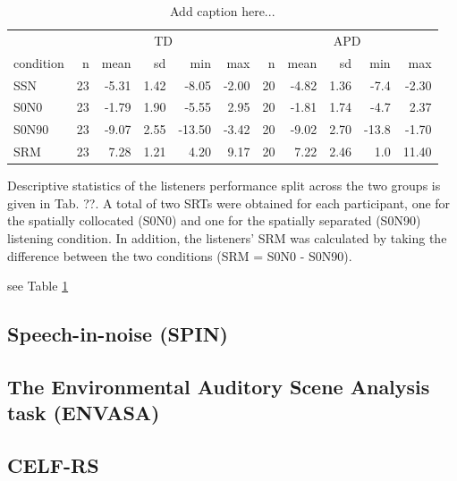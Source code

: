 \documentclass[a4paper, twoside]{templates/ociamthesis}
\begin{document}
\begin{table}

\caption{\label{tab:LiSNS-uRevs}Add caption here...}
\centering
\begin{tabular}[t]{lrrrrrrrrrr}
\toprule
\multicolumn{1}{c}{ } & \multicolumn{5}{c}{TD} & \multicolumn{5}{c}{APD} \\
\cmidrule(l{3pt}r{3pt}){2-6} \cmidrule(l{3pt}r{3pt}){7-11}
condition & n & mean & sd & min & max & n & mean & sd & min & max\\
\midrule
SSN & 23 & -5.31 & 1.42 & -8.05 & -2.00 & 20 & -4.82 & 1.36 & -7.4 & -2.30\\
S0N0 & 23 & -1.79 & 1.90 & -5.55 & 2.95 & 20 & -1.81 & 1.74 & -4.7 & 2.37\\
S0N90 & 23 & -9.07 & 2.55 & -13.50 & -3.42 & 20 & -9.02 & 2.70 & -13.8 & -1.70\\
SRM & 23 & 7.28 & 1.21 & 4.20 & 9.17 & 20 & 7.22 & 2.46 & 1.0 & 11.40\\
\bottomrule
\end{tabular}
\end{table}

Descriptive statistics of the listeners performance split across the two groups is given in Tab. ??. A total of two SRTs were obtained for each participant, one for the spatially collocated (S0N0) and one for the spatially separated (S0N90) listening condition. In addition, the listeners' SRM was calculated by taking the difference between the two conditions (SRM = S0N0 - S0N90).

see Table \ref{tab:LiSNS-uRevs}

\hypertarget{speech-in-noise-spin-1}{%
\subsection{Speech-in-noise (SPIN)}\label{speech-in-noise-spin-1}}

\hypertarget{the-environmental-auditory-scene-analysis-task-envasa-1}{%
\subsection{The Environmental Auditory Scene Analysis task (ENVASA)}\label{the-environmental-auditory-scene-analysis-task-envasa-1}}

\hypertarget{celf-rs-1}{%
\subsection{CELF-RS}\label{celf-rs-1}}
\end{document}
